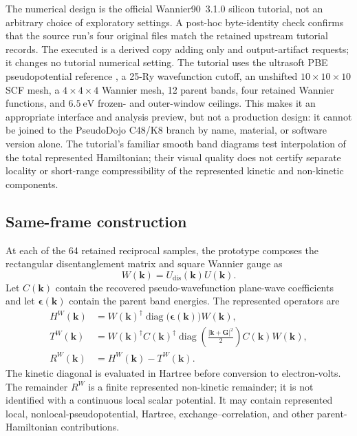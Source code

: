 The numerical design is the official Wannier90~3.1.0
 silicon tutorial, not an arbitrary choice of
exploratory settings. A post-hoc byte-identity check confirms that the source
run's four original files match the retained upstream tutorial records. The
executed  is a derived copy adding only
 and  output-artifact requests;
it changes no tutorial numerical setting. The tutorial uses the ultrasoft PBE
pseudopotential reference
, a 25-Ry wavefunction cutoff, an unshifted
$10\times10\times10$ SCF mesh, a $4\times4\times4$ Wannier mesh, 12 parent
bands, four retained Wannier functions, and $6.5\ \mathrm{eV}$ frozen- and
outer-window ceilings. This makes it an appropriate interface and analysis
preview, but not a production design: it cannot be joined to the PseudoDojo
C48/K8 branch by name, material, or software version alone. The tutorial's
familiar smooth band diagrams test interpolation of the total represented
Hamiltonian; their visual quality does not certify separate locality or
short-range compressibility of the represented kinetic and non-kinetic
components.

\subsection{Same-frame construction}

At each of the 64 retained reciprocal samples, the prototype composes the
rectangular disentanglement matrix and square Wannier gauge as
\begin{equation}
  W(\mathbf k)=U_{\mathrm{dis}}(\mathbf k)U(\mathbf k).
\end{equation}
Let $C(\mathbf k)$ contain the recovered pseudo-wavefunction plane-wave
coefficients and let $\boldsymbol\epsilon(\mathbf k)$ contain the parent band
energies. The represented operators are
\begin{align}
  H^W(\mathbf k)
    &=W(\mathbf k)^\dagger
      \operatorname{diag}\!\bigl(\boldsymbol\epsilon(\mathbf k)\bigr)
      W(\mathbf k),\\
  T^W(\mathbf k)
    &=W(\mathbf k)^\dagger C(\mathbf k)^\dagger
      \operatorname{diag}\!\left(\frac{|\mathbf k+\mathbf G|^2}{2}\right)
      C(\mathbf k)W(\mathbf k),\\
  R^W(\mathbf k)&=H^W(\mathbf k)-T^W(\mathbf k).
\end{align}
The kinetic diagonal is evaluated in Hartree before conversion to
electron-volts. The remainder $R^W$ is a finite represented non-kinetic
remainder; it is not identified with a continuous local scalar potential. It
may contain represented local, nonlocal-pseudopotential, Hartree,
exchange--correlation, and other parent-Hamiltonian contributions.

